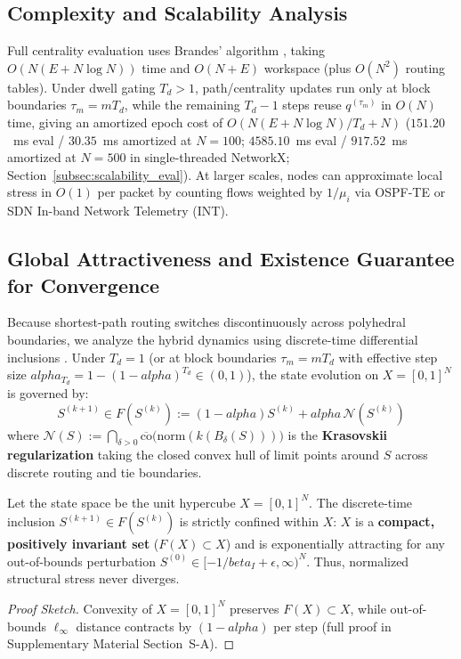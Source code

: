 \documentclass{ccjnl}
\newcommand{\rev}[1]{#1}
\def\rev#1{#1}%
\def\kappa{k}%
\def\alpha{alpha}%
\def\beta{beta}%
\begin{document}
\subsection*{Complexity and Scalability Analysis}

Full centrality evaluation uses Brandes' algorithm \cite{Brandes2001Faster}, taking $O(N(E + N \log N))$ time and $O(N+E)$ workspace \rev{(plus $O(N^2)$ routing tables). Under dwell gating $T_d > 1$, path/centrality updates run only at block boundaries $\tau_m = m T_d$, while the remaining $T_d - 1$ steps reuse $q^{(\tau_m)}$ in $O(N)$ time, giving an amortized epoch cost of $O(N(E + N \log N)/T_d + N)$ ($151.20$~ms eval / $30.35$~ms amortized at $N=100$; $4585.10$~ms eval / $917.52$~ms amortized at $N=500$ in single-threaded NetworkX; Section~\ref{subsec:scalability_eval}).} At larger scales, nodes can approximate local stress in $O(1)$ per packet by counting flows weighted by $1/\mu_i$ \cite{Maccari2020DistributedLoad} via OSPF-TE or SDN In-band Network Telemetry (INT).

\subsection{Global Attractiveness and Existence Guarantee for Convergence}
\label{sec:convergence_analysis}
\label{subsec:attractivity}

Because shortest-path routing switches discontinuously across polyhedral boundaries, we analyze the hybrid dynamics using discrete-time differential inclusions \cite{Aubin1984Differential}. Under $T_d=1$ (or at block boundaries $\tau_m = m T_d$ with effective step size $\alpha_{T_d} = 1 - (1-\alpha)^{T_d} \in (0,1)$), the state evolution on $X = [0,1]^N$ is governed by:
\begin{equation}\label{eq:inclusion_map}
S^{(k+1)} \in F(S^{(k)}) := (1-\alpha)S^{(k)}+\alpha\,\mathcal{N}(S^{(k)})
\end{equation}
where $\mathcal{N}(S) := \bigcap_{\delta > 0} \overline{\mathrm{co}}\big(\mathrm{norm}(\kappa(B_\delta(S)))\big)$ is the \textbf{Krasovskii regularization} taking the closed convex hull of limit points around $S$ across discrete routing and tie boundaries.

\begin{lemma}
\label{lemma:invariance}
Let the state space be the unit hypercube $X=[0,1]^N$. 
The discrete-time inclusion $S^{(k+1)}\in F(S^{(k)})$ is strictly confined within $X$: $X$ is a \textbf{compact, positively invariant set} ($F(X) \subset X$) and is \rev{exponentially attracting for any out-of-bounds perturbation $S^{(0)} \in [-1/\beta_I + \epsilon, \infty)^N$}. Thus, normalized structural stress never diverges.
\end{lemma}
\begin{proof}[Proof Sketch]
Convexity of $X=[0,1]^N$ preserves $F(X)\subset X$, while out-of-bounds $\ell_\infty$ distance contracts by $(1-\alpha)$ per step (full proof in Supplementary Material Section~S-A).
\end{proof}
\end{document}
